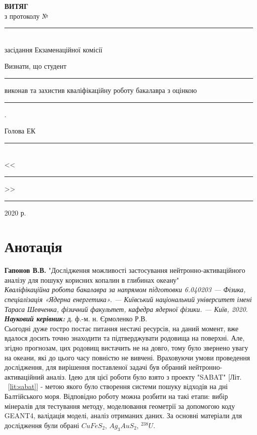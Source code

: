 \documentclass[a4paper, 14pt]{article}
\numberwithin{equation}{section}
\numberwithin{table}{section}
\begin{document}
\begin{titlepage}
	\renewcommand{\baselinestretch}{1.0}
	\newcommand{\ul}[1]{\rule{#1}{0.1pt}}
	\begin{spacing}{1.8}
		\vspace*{4.5cm}
		{\center
			{\bf ВИТЯГ}\\
			з протоколу № \ul{2.4cm}\\
			засідання Екзаменаційної комісії\\[2cm]}
		{\noindent
			Визнати, що студент \ul{7.2cm} виконав та захистив кваліфікаційну роботу бакалавра з оцінкою \ul{7.2cm} .\\[1cm]}
		{\flushright
			Голова ЕК \ul{7.8cm}\\
			<<\ul{1cm}>> \ul{4cm} 2020 р.\\}
	\end{spacing}
\end{titlepage}


\pagestyle{empty}
\section*{Анотація}

{\bf Гапонов В.В.} "Дослідження можливості застосування нейтронно-активаційного аналізу для пошуку корисних копалин в глибинах океану"\\
{\itshape Кваліфікаційна робота бакалавра за напрямом підготовки 6.040203 --- Фізика, спеціалізація «Ядерна енергетика». --- Київський національний університет імені Тараса Шевченка, фізичний факультет, кафедра ядерної фізики. --- Київ, 2020.} \\
{\itshape \bfseries Науковий керівник:} д. ф.-м. н. Єрмоленко Р.В.%
\\[0.5cm]
Сьогодні дуже гостро постає питання нестачі ресурсів, на даний момент, вже вдалося досить точно знаходити та підтверджувати родовища на поверхні. Але, згідно прогнозам, цих родовищ вистачить не на довго, тому було звернено увагу на океани, які до цього часу повністю не вивчені. 
Враховуючи умови проведення дослідження, для вирішення поставленої задачі був обраний нейтронно-активаційний аналіз. Ідею для цієї роботи було взято з проекту "SABAT" [Літ. ~\ref{lit:sabat}] - метою якого було створення системи пошуку відходів на дні Балтійського моря. Відповідно роботу можна розбити на такі етапи: вибір мінералів для тестування методу, моделювання геометрії за допомогою коду GEANT4, валідація моделі, аналіз отриманих даних. За основні матеріали для дослідження були обрані $CuFeS_2$, $Ag_3AuS_2$, $^{238}U$. 
\end{document}

